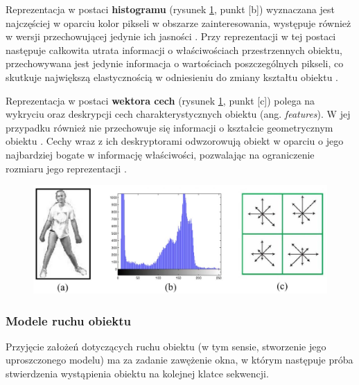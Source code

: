Reprezentacja w postaci \textbf{histogramu} (rysunek \ref{fig:Modele_obiektu_zainteresowania}, punkt [b]) wyznaczana jest najczęściej w oparciu kolor pikseli w obszarze zainteresowania, występuje również w wersji przechowującej jedynie ich jasności \cite{Smeulders2010}. Przy reprezentacji w tej postaci następuje całkowita utrata informacji o właściwościach przestrzennych obiektu, przechowywana jest jedynie informacja o wartościach poszczególnych pikseli, co skutkuje największą elastycznością w odniesieniu do zmiany kształtu obiektu \cite{Smeulders2010}.

Reprezentacja w postaci \textbf{wektora cech} (rysunek \ref{fig:Modele_obiektu_zainteresowania}, punkt [c]) polega na wykryciu oraz deskrypcji cech charakterystycznych obiektu (ang. \textit{features}). W jej przypadku również nie przechowuje się informacji o kształcie geometrycznym obiektu \cite{Smeulders2010}. Cechy wraz z ich deskryptorami odwzorowują obiekt w oparciu o jego najbardziej bogate w informację właściwości, pozwalając na ograniczenie rozmiaru jego reprezentacji \cite{Smeulders2010}.

\begin{figure}[!htb]
	\begin{center}
		\includegraphics[width=12cm]{images/target_appearance_representation.png}
	\end{center}	
\label{fig:Modele_obiektu_zainteresowania}
\end{figure}

\subsubsection{Modele ruchu obiektu}
\label{subsubsec:Modele_ruchu_obiektu}

Przyjęcie założeń dotyczących ruchu obiektu (w tym sensie, stworzenie jego uproszczonego modelu) ma za zadanie zawężenie okna, w którym następuje próba stwierdzenia wystąpienia obiektu na kolejnej klatce sekwencji.

